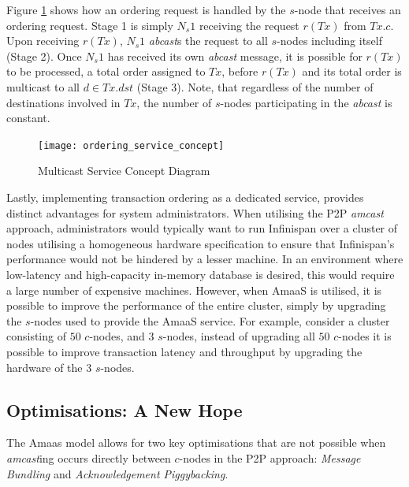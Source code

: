 Figure \ref{fig:ordering_service_concept} shows how an ordering request is handled by the $s$-node that receives an ordering request.  Stage 1 is simply $N_s1$ receiving the request $r(Tx)$ from $Tx.c$.  Upon receiving $r(Tx)$, $N_s1$ \emph{abcast}s the request to all $s$-nodes including itself (Stage 2).  Once $N_s1$ has received its own \emph{abcast} message, it is possible for $r(Tx)$ to be processed, a total order assigned to $Tx$, before $r(Tx)$ and its total order is multicast to all $d \in Tx.dst$ (Stage 3).  Note, that regardless of the number of destinations involved in $Tx$, the number of $s$-nodes participating in the \emph{abcast} is constant.  

    \begin{figure}[htbp!] 
        \centering    
         \texttt{[image: ordering\_service\_concept]}
         \caption[Multicast Service Concept Diagram]{Multicast Service Concept Diagram}
         \label{fig:ordering_service_concept}
    \end{figure}	 

	Lastly, implementing transaction ordering as a dedicated service, provides distinct advantages for system administrators.  When utilising the P2P \emph{amcast} approach, administrators would typically want to run Infinispan over a cluster of nodes utilising a homogeneous hardware specification to ensure that Infinispan's performance would not be hindered by a lesser machine.  In an environment where low-latency and high-capacity in-memory database is desired, this would require a large number of expensive machines. However, when \textsf{AmaaS} is utilised, it is possible to improve the performance of the entire cluster, simply by upgrading the $s$-nodes used to provide the \textsf{AmaaS} service.  For example, consider a cluster consisting of $50$ $c$-nodes, and $3$ $s$-nodes, instead of upgrading all $50$ $c$-nodes it is possible to improve transaction latency and throughput by upgrading the hardware of the $3$ $s$-nodes.  
	
	\subsection{Optimisations: A New Hope}\label{ssec:abaas_optimisations}
	The \textsf{Amaas} model allows for two key optimisations that are not possible when \emph{amcast}ing occurs directly between $c$-nodes in the P2P approach: \emph{Message Bundling} and \emph{Acknowledgement Piggybacking}.  
	
